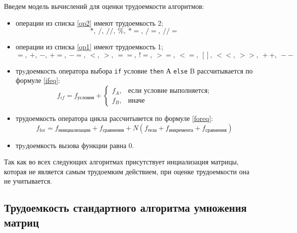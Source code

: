 Введем модель вычислений для оценки трудоемкости алгоритмов:
\begin{itemize}[left=\parindent]
    \item операции из списка \ref{op2} имеют трудоемкость 2;
        \begin{equation}\label{op2}
            *,~/,~//,~\%,~*=,~/=,~//=
        \end{equation}

    \item операции из списка \ref{op1} имеют трудоемкость 1;
        \begin{equation}\label{op1}
            =,~+,~-,~+=,~-=,~<,~>,~==,~!=,~>=,~<=,~[],~<<,~>>,~++,~--
        \end{equation}

    \item трyдоемкость оператора выбора \texttt{if} условие \texttt{then} А
        \texttt{else} B рассчитывается по формуле \ref{ifeq}:
        \begin{equation}\label{ifeq}
            f_{if} = f_{условия} +
            \begin{cases}
                f_A, & \text{если условие выполняется;}\\
                f_B, & \text{иначе}
            \end{cases}
        \end{equation}

    \item трудоемкость оператора цикла рассчитывется по формуле \ref{foreq}:
        \begin{equation}\label{foreq}
            f_{\text{for}} = f_{\text{инициализации}} + f_{\text{сравнения}} +
                      N(f_{\text{тела}} + f_{\text{инкремента}} +
                      f_{\text{сравнения}})
        \end{equation}

    \item трyдоемкость вызова функции равна 0.
\end{itemize}

Так как во всех следующих алгоритмах присутствует инциализация матрицы, которая
не является самым трудоемким действием, при оценке трудоемкости она не
учитывается.

\subsection{Трудоемкость стандартного алгоритма умножения матриц}


